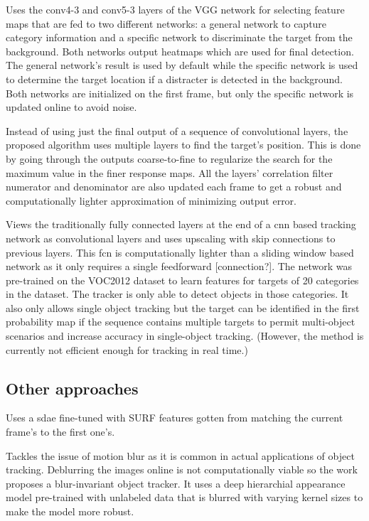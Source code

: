 \cite{FCN_TRACK_2}
Uses the conv4-3 and conv5-3 layers of the VGG network for selecting feature maps
that are fed to two different networks: a general network to capture category information
and a specific network to discriminate the target from the background. Both networks
output heatmaps which are used for final detection. The general network's result is used
by default while the specific network is used to determine the target location if
a distracter is detected in the background. Both networks are initialized on the first
frame, but only the specific network is updated online to avoid noise.

\cite{HIERARCH_FEATS}
Instead of using just the final output of a sequence of convolutional layers, the
proposed algorithm uses multiple layers to find the target's position. This is done
by going through the outputs coarse-to-fine to regularize the search for the maximum
value in the finer response maps. All the layers' correlation filter numerator and
denominator are also updated each frame to get a robust and computationally lighter
approximation of minimizing output error.

\cite{FCN_TRACK}
Views the traditionally fully connected layers at the end of a \ac{cnn} based
tracking network as convolutional layers and uses upscaling with skip connections
to previous layers. This \ac{fcn} is computationally lighter than a sliding window
based network as it only requires a single feedforward [connection?]. The network
was pre-trained on the VOC2012 dataset to learn features for targets of 20 categories
in the dataset. The tracker is only able to detect objects in those categories.
It also only allows single object tracking but the target can be identified in the
first probability map if the sequence contains multiple targets to permit multi-object
scenarios and increase accuracy in single-object tracking. (However, the method is
currently not efficient enough for tracking in real time.)

\subsection{Other approaches}
\cite{SMS_DLT}
Uses a \ac{sdae} fine-tuned with SURF features gotten from matching the current frame's
to the first one's.

\cite{BLUR_TRACK}
Tackles the issue of motion blur as it is common in actual applications of object
tracking. Deblurring the images online is not computationally viable so the work
proposes a blur-invariant object tracker. It uses a deep hierarchial appearance
model pre-trained with unlabeled data that is blurred with varying kernel sizes
to make the model more robust. 